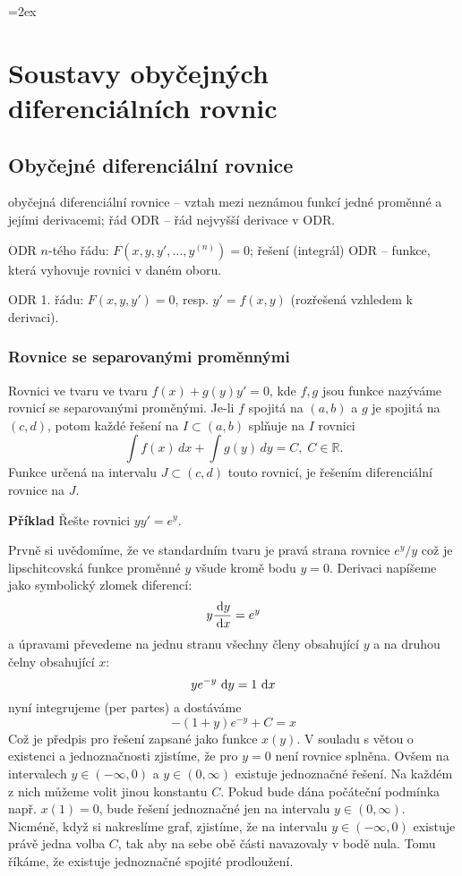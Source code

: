 \documentclass[a4paper,10pt]{book}
\def\d{\,{\rm d}}               %
\begin{document}
\parskip=2ex
\parindent=0pt
\pagestyle{empty}

\chapter{Soustavy obyčejných diferenciálních rovnic}
\section{Obyčejné diferenciální rovnice}
obyčejná diferenciální rovnice -- vztah mezi neznámou funkcí jedné proměnné a jejími derivacemi;
řád ODR -- řád nejvyšší derivace v ODR.

ODR $n$-tého řádu: $F(x,y,y',\ldots,y^{(n)})=0$;
řešení (integrál) ODR -- funkce, která vyhovuje rovnici v daném oboru.

ODR 1. řádu: $F(x,y,y')=0$, resp. $y'=f(x,y)$ (rozřešená vzhledem k derivaci).

\subsection{Rovnice se separovanými proměnnými}
   Rovnici ve tvaru ve tvaru $f(x)+g(y)y'=0$, kde $f,g$ jsou funkce nazýváme
   rovnicí se separovanými proměnými.
   Je-li $f$ spojitá na $(a,b)$ a $g$ je spojitá na $(c,d)$,
   potom každé řešení na $I\subset(a,b)$ splňuje na $I$ rovnici
   \[
      \int f(x)\,dx + \int g(y)\,dy = C, \; C\in\mathbb{R}.
   \]
   Funkce určená na intervalu $J\subset(c,d)$ touto rovnicí, je řešením diferenciální rovnice na $J$.

   {\bf Příklad}
   Řešte rovnici $yy'=e^y$.

   Prvně si uvědomíme, že ve standardním tvaru je pravá strana rovnice $e^y/y$ což je lipschitcovská funkce
   proměnné $y$ všude kromě bodu $y=0$.
   Derivaci napíšeme jako symbolický zlomek diferencí:
   \[
    	y\frac{\d y}{\d x}=e^y
   \]
   a úpravami převedeme na jednu stranu všechny členy  obsahující $y$ a na druhou čelny obsahující $x$:
   \[
    	ye^{-y}\,\d y=1\,\d x
   \]
   nyní integrujeme (per partes) a dostáváme
   \[
      -(1+y)e^{-y}+C=x
   \]
   Což je předpis pro řešení zapsané jako funkce $x(y)$. V souladu s větou o existenci a jednoznačnosti
   zjistíme, že pro $y=0$ není rovnice splněna. Ovšem na intervalech $y\in(-\infty,0)$ a  $y\in(0,\infty)$
   existuje jednoznačné řešení. Na každém z nich můžeme volit jinou konstantu $C$. Pokud bude dána počáteční
   podmínka např. $x(1)=0$, bude řešení jednoznačné jen na intervalu $y\in(0,\infty)$. Nicméně, když si nakreslíme graf,
   zjistíme, že na intervalu $y\in(-\infty,0)$ existuje právě jedna volba $C$, tak aby na sebe obě části navazovaly
   v bodě nula. Tomu říkáme, že existuje jednoznačné spojité prodloužení.
  
\end{document}
